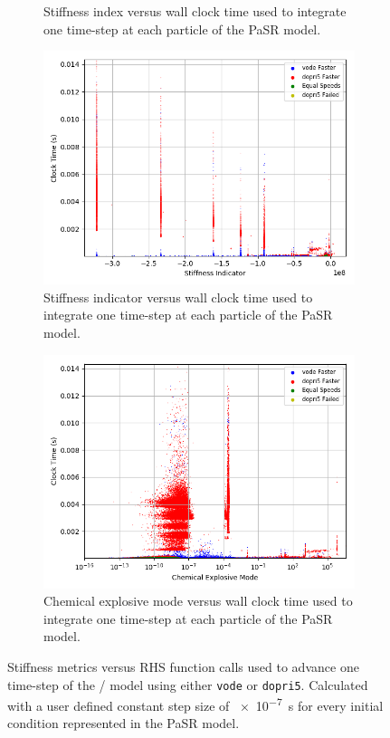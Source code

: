 \documentclass[12pt]{ussci}
\begin{document}
\begin{figure}[htbp]
\begin{subfigure}{0.43\textwidth}
        \caption{Stiffness index versus wall clock time used to integrate one time-step at each particle of the PaSR model.}
        \label{fig:SI1H2COPaSR}
    \end{subfigure}
    \begin{subfigure}{0.43\textwidth}
        \includegraphics[width=\linewidth]{H2_CO/PaSR_Int_Times_Indicator_Groupings_1e-07.png}
        \caption{Stiffness indicator versus wall clock time used to integrate one time-step at each particle of the PaSR model.}
        \label{fig:SI2H2COPaSR}
    \end{subfigure}
    \hfill
    \begin{subfigure}{0.43\textwidth}
        \includegraphics[width=\linewidth]{H2_CO/PaSR_Int_Times_CEMA_Groupings_1e-07.png}
        \caption{Chemical explosive mode versus wall clock time used to integrate one time-step at each particle of the PaSR model.}
        \label{fig:CEMH2COPaSR}
    \end{subfigure}
    \caption{Stiffness metrics versus RHS function calls used to advance one time-step of the \slash {} model using either \texttt{vode} or \texttt{dopri5}.  Calculated with a user defined constant step size of \SI{e-7}{\second} for every initial condition represented in the PaSR model.}
    \label{fig:H2COPaSRStiffness}
\end{figure}
\end{document}
